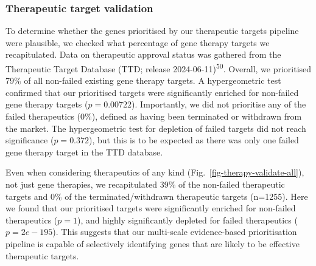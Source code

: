 \documentclass[
]{agujournal2019}
\begin{document}
\subsubsection{Therapeutic target
validation}\label{therapeutic-target-validation}

To determine whether the genes prioritised by our therapeutic targets
pipeline were plausible, we checked what percentage of gene therapy
targets we recapitulated. Data on therapeutic approval status was
gathered from the Therapeutic Target Database (TTD; release
2024-06-11)\textsuperscript{50}. Overall, we prioritised 79\% of all
non-failed existing gene therapy targets. A hypergeometric test
confirmed that our prioritised targets were significantly enriched for
non-failed gene therapy targets (\(p=0.00722\)). Importantly, we did not
prioritise any of the failed therapeutics (0\%), defined as having been
terminated or withdrawn from the market. The hypergeometric test for
depletion of failed targets did not reach significance (\(p=0.372\)),
but this is to be expected as there was only one failed gene therapy
target in the TTD database.

Even when considering therapeutics of any kind
(Fig.~\ref{fig-therapy-validate-all}), not just gene therapies, we
recapitulated 39\% of the non-failed therapeutic targets and 0\% of the
terminated/withdrawn therapeutic targets (n=1255). Here we found that
our prioritised targets were significantly enriched for non-failed
therapeutics (\(p=1\)), and highly significantly depleted for failed
therapeutics (\(p=2e-195\)). This suggests that our multi-scale
evidence-based prioritisation pipeline is capable of selectively
identifying genes that are likely to be effective therapeutic targets.
\end{document}
